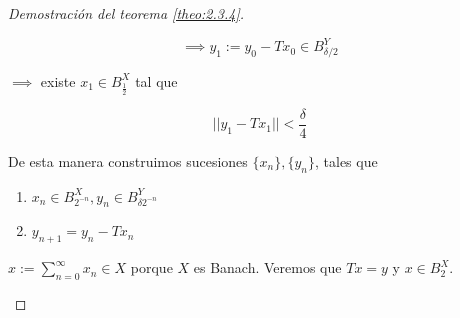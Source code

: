 \begin{proof}[Demostración del teorema \ref{theo:2.3.4}]
\begin{enumerate}
        \[\implies y_1:=y_0-Tx_0\in B_{\delta/2}^Y\]

        $\implies$ existe $x_1\in B_{\frac{1}{2}}^X$ tal que 

        \[||y_1-Tx_1||<\frac{\delta}{4}\]

        De esta manera construimos sucesiones $\{x_n\},\{y_n\}$, tales que

        \begin{enumerate}
            \item $x_n\in B_{2^{-n}}^X, y_n\in B_{\delta 2^{-n}}^Y$
            \item $y_{n+1}=y_n-Tx_n$
        \end{enumerate}

        $x:=\displaystyle\sum_{n=0}^\infty x_n\in X$ porque $X$ es Banach. Veremos que $Tx=y$ y $x\in B_2^X$.
    \end{enumerate}
\end{proof}